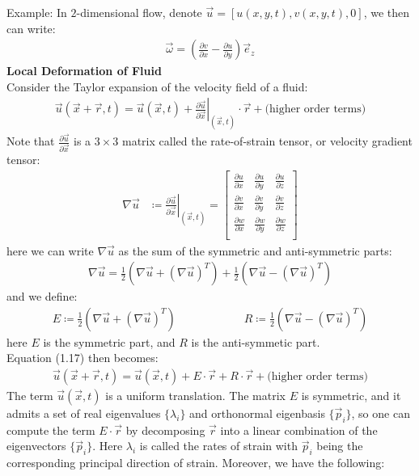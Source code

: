 \documentclass[11pt]{book}
\theoremstyle{break}
\theoremstyle{break}
\newcommand{\bmat}[1]{\begin{bmatrix} #1 \end{bmatrix}}
\newcommand{\example}{\color{green}Example: \color{black}}
\begin{document}
\example In $2$-dimensional flow, denote $\vec{u} = [u(x,y,t),v(x,y,t),0]$, we then can write:
\begin{align*}
\vec{\omega} = \left(\frac{\partial v}{\partial x} - \frac{\partial u}{\partial y}\right)\vec{e}_z
\end{align*}
\hfill\break
\hfill\break
\textbf{Local Deformation of Fluid}\\
Consider the Taylor expansion of the velocity field of a fluid:
\begin{align}
\vec{u}(\vec{x}+\vec{r},t) = \vec{u}(\vec{x},t) + \left.\frac{\partial \vec{u}}{\partial \vec{x}}\right|_{(\vec{x},t)} \cdot \vec{r} +\text{(higher order terms)}
\end{align}
Note that $\frac{\partial \vec{u}}{\partial \vec{x}}$ is a $3\times 3$ matrix called the rate-of-strain tensor, or velocity gradient tensor:
\begin{align*}
\nabla \vec{u} &\coloneqq \left.\frac{\partial \vec{u}}{\partial \vec{x}}\right|_{(\vec{x},t)} = \bmat{
\frac{\partial u}{\partial x} & \frac{\partial u}{\partial y} & \frac{\partial u}{\partial z}\\
\frac{\partial v}{\partial x} & \frac{\partial v}{\partial y} & \frac{\partial v}{\partial z}\\
\frac{\partial w}{\partial x} & \frac{\partial w}{\partial y} & \frac{\partial w}{\partial z}\\
}
\end{align*}
here we can write $\nabla \vec{u}$ as the sum of the symmetric and anti-symmetric parts:
\begin{align*}
\nabla \vec{u} = \frac{1}{2}( \nabla \vec{u}+ (\nabla \vec{u})^T)+ \frac{1}{2}(\nabla \vec{u} -( \nabla \vec{u})^T)
\end{align*}
and we define:
\begin{align*}
E \coloneqq \frac{1}{2}( \nabla \vec{u}+ (\nabla \vec{u})^T) \qquad\qquad\qquad
R \coloneqq \frac{1}{2}(\nabla \vec{u} -( \nabla \vec{u})^T)
\end{align*}
here $E$ is the symmetric part, and $R$ is the anti-symmetic part. \\
Equation (1.17) then becomes:
\begin{align*}
\vec{u}(\vec{x}+\vec{r}, t) = \vec{u}(\vec{x},t)+ E\cdot \vec{r} + R\cdot \vec{r} +\text{(higher order terms)} 
\end{align*}
The term $\vec{u}(\vec{x},t)$ is a uniform translation. The matrix $E $ is symmetric, and it admits a set of real eigenvalues $\{\lambda_i\}$ and orthonormal eigenbasis $\{\vec{p}_i\}$, so one can compute the term $E\cdot \vec{r}$ by decomposing $\vec{r}$ into a linear combination of the eigenvectors $\{\vec{p}_i\}$. Here $\lambda_i$ is called the rates of strain with $\vec{p}_i$ being the corresponding principal direction of strain. Moreover, we have the following:
\end{document}
